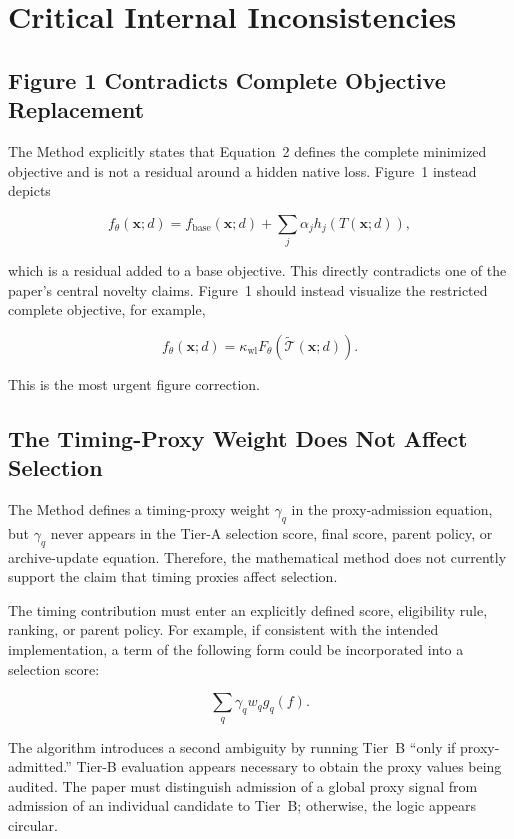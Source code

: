 \documentclass[11pt]{article}
\begin{document}
\section{Critical Internal Inconsistencies}

\subsection{Figure 1 Contradicts Complete Objective Replacement}

The Method explicitly states that Equation~2 defines the complete minimized
objective and is not a residual around a hidden native loss. Figure~1 instead
depicts

\[
f_\theta(\mathbf{x};d)=f_{\mathrm{base}}(\mathbf{x};d)
+\sum_j\alpha_jh_j(T(\mathbf{x};d)),
\]

which is a residual added to a base objective. This directly contradicts one
of the paper's central novelty claims. Figure~1 should instead visualize the
restricted complete objective, for example,

\[
f_\theta(\mathbf{x};d)=\kappa_{\mathrm{wl}}
F_\theta\!\left(\widetilde{\mathcal T}(\mathbf{x};d)\right).
\]

This is the most urgent figure correction.

\subsection{The Timing-Proxy Weight Does Not Affect Selection}

The Method defines a timing-proxy weight $\gamma_q$ in the proxy-admission
equation, but $\gamma_q$ never appears in the Tier-A selection score, final
score, parent policy, or archive-update equation. Therefore, the mathematical
method does not currently support the claim that timing proxies affect
selection.

The timing contribution must enter an explicitly defined score, eligibility
rule, ranking, or parent policy. For example, if consistent with the intended
implementation, a term of the following form could be incorporated into a
selection score:

\[
\sum_q \gamma_q w_q g_q(f).
\]

The algorithm introduces a second ambiguity by running Tier~B ``only if
proxy-admitted.'' Tier-B evaluation appears necessary to obtain the proxy
values being audited. The paper must distinguish admission of a global proxy
signal from admission of an individual candidate to Tier~B; otherwise, the
logic appears circular.
\end{document}
